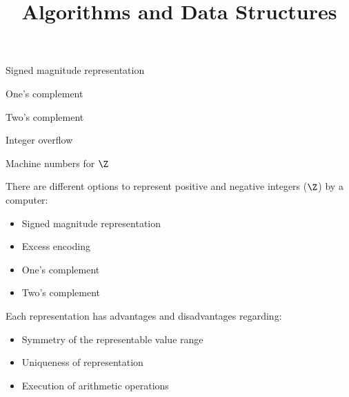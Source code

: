 \documentclass[11pt,compress,t,notes=noshow, xcolor=table]{beamer}
\title{Algorithms and Data Structures}
\begin{document}
{
  \item Signed magnitude representation
  \item One's complement
  \item Two's complement
  \item Integer overflow
}



\begin{vbframe}{Machine numbers for $\Z$}


%
There are different options to represent positive and negative integers ($\Z$) by a computer:
\begin{itemize}
  \item Signed magnitude representation
  \item Excess encoding
  \item One's complement
  \item Two's complement
\end{itemize}

\lz 


Each representation has advantages and disadvantages regarding:
\begin{itemize}
  \item Symmetry of the representable value range
  \item Uniqueness of representation
  \item Execution of arithmetic operations
\end{itemize}
\end{vbframe}
\end{document}
